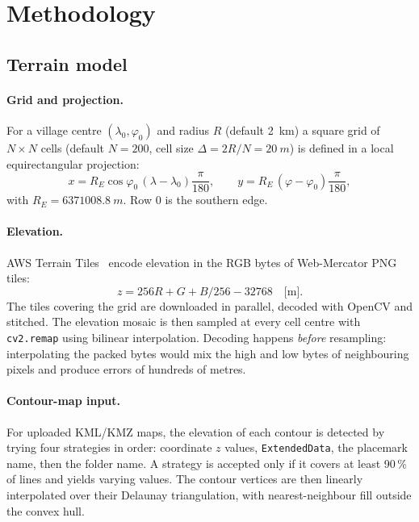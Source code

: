 \documentclass[11pt,a4paper]{article}
\newcommand{\code}[1]{\texttt{\small #1}}
\begin{document}
\section{Methodology}\label{sec:method}
\subsection{Terrain model}
\paragraph{Grid and projection.} For a village centre $(\lambda_0,\varphi_0)$ and radius $R$
(default \SI{2}{km}) a square grid of $N\times N$ cells (default $N=200$, cell size
$\Delta=2R/N=\SI{20}{m}$) is defined in a local equirectangular projection:
\begin{equation}
x = R_E\cos\varphi_0\,(\lambda-\lambda_0)\frac{\pi}{180},\qquad
y = R_E\,(\varphi-\varphi_0)\frac{\pi}{180},
\end{equation}
with $R_E=\SI{6371008.8}{m}$. Row 0 is the southern edge.

\paragraph{Elevation.} AWS Terrain Tiles~\cite{terraintiles} encode elevation in the RGB bytes
of Web-Mercator PNG tiles:
\begin{equation}
z = 256R + G + B/256 - 32768 \quad\text{[m]}.
\end{equation}
The tiles covering the grid are downloaded in parallel, decoded with OpenCV and stitched. The
elevation mosaic is then sampled at every cell centre with \code{cv2.remap} using bilinear
interpolation. Decoding happens \emph{before} resampling: interpolating the packed bytes would
mix the high and low bytes of neighbouring pixels and produce errors of hundreds of metres.

\paragraph{Contour-map input.} For uploaded KML/KMZ maps, the elevation of each contour is
detected by trying four strategies in order: coordinate $z$ values, \code{ExtendedData}, the
placemark name, then the folder name. A strategy is accepted only if it covers at least 90\,\%
of lines and yields varying values. The contour vertices are then linearly interpolated over
their Delaunay triangulation, with nearest-neighbour fill outside the convex hull.
\end{document}
